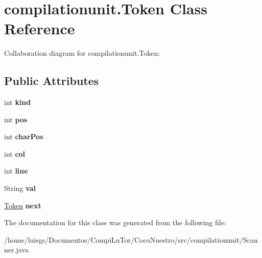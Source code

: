 \hypertarget{classcompilationunit_1_1_token}{
\section{compilationunit.Token Class Reference}
\label{classcompilationunit_1_1_token}
}


Collaboration diagram for compilationunit.Token:
\subsection*{Public Attributes}
\begin{DoxyCompactItemize}
\item 
\hypertarget{classcompilationunit_1_1_token_af7c2e7e2bee99be419210065fd5651d6}{
int {\bfseries kind}}
\label{classcompilationunit_1_1_token_af7c2e7e2bee99be419210065fd5651d6}

\item 
\hypertarget{classcompilationunit_1_1_token_a7ae47ae97e60be14a640910629e83636}{
int {\bfseries pos}}
\label{classcompilationunit_1_1_token_a7ae47ae97e60be14a640910629e83636}

\item 
\hypertarget{classcompilationunit_1_1_token_aa00436bec1c0579303f47020783606db}{
int {\bfseries charPos}}
\label{classcompilationunit_1_1_token_aa00436bec1c0579303f47020783606db}

\item 
\hypertarget{classcompilationunit_1_1_token_aa98347e42fe71da40580ab02a8c4da45}{
int {\bfseries col}}
\label{classcompilationunit_1_1_token_aa98347e42fe71da40580ab02a8c4da45}

\item 
\hypertarget{classcompilationunit_1_1_token_a82c172b41a8367d39a1fb46863db00de}{
int {\bfseries line}}
\label{classcompilationunit_1_1_token_a82c172b41a8367d39a1fb46863db00de}

\item 
\hypertarget{classcompilationunit_1_1_token_a0c2be00f067fa90de4b14feb70752c3c}{
String {\bfseries val}}
\label{classcompilationunit_1_1_token_a0c2be00f067fa90de4b14feb70752c3c}

\item 
\hypertarget{classcompilationunit_1_1_token_add88f0df57b86c0f2ac6c40bf066b80f}{
\hyperlink{classcompilationunit_1_1_token}{Token} {\bfseries next}}
\label{classcompilationunit_1_1_token_add88f0df57b86c0f2ac6c40bf066b80f}

\end{DoxyCompactItemize}


The documentation for this class was generated from the following file:\begin{DoxyCompactItemize}
\item 
/home/luisgs/Documentos/CompiLuTor/CocoNuestro/src/compilationunit/Scanner.java\end{DoxyCompactItemize}
